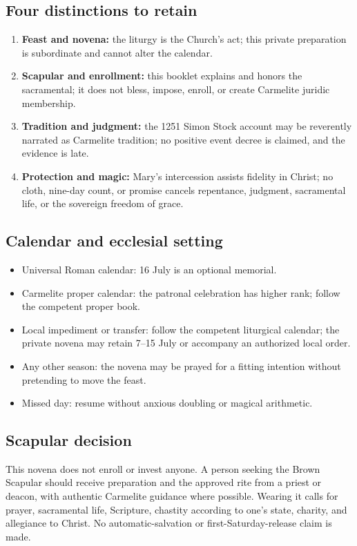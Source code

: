 \subsection{Four distinctions to retain}

\begin{enumerate}
\item \textbf{Feast and novena:} the liturgy is the Church's act; this private preparation is subordinate and cannot alter the calendar.
\item \textbf{Scapular and enrollment:} this booklet explains and honors the sacramental; it does not bless, impose, enroll, or create Carmelite juridic membership.
\item \textbf{Tradition and judgment:} the 1251 Simon Stock account may be reverently narrated as Carmelite tradition; no positive event decree is claimed, and the evidence is late.
\item \textbf{Protection and magic:} Mary's intercession assists fidelity in Christ; no cloth, nine-day count, or promise cancels repentance, judgment, sacramental life, or the sovereign freedom of grace.
\end{enumerate}

\subsection{Calendar and ecclesial setting}

\begin{itemize}
\item Universal Roman calendar: 16 July is an optional memorial.
\item Carmelite proper calendar: the patronal celebration has higher rank; follow the competent proper book.
\item Local impediment or transfer: follow the competent liturgical calendar; the private novena may retain 7--15 July or accompany an authorized local order.
\item Any other season: the novena may be prayed for a fitting intention without pretending to move the feast.
\item Missed day: resume without anxious doubling or magical arithmetic.
\end{itemize}

\subsection{Scapular decision}

This novena does not enroll or invest anyone. A person seeking the Brown Scapular should receive preparation and the approved rite from a priest or deacon, with authentic Carmelite guidance where possible. Wearing it calls for prayer, sacramental life, Scripture, chastity according to one's state, charity, and allegiance to Christ. No automatic-salvation or first-Saturday-release claim is made.

